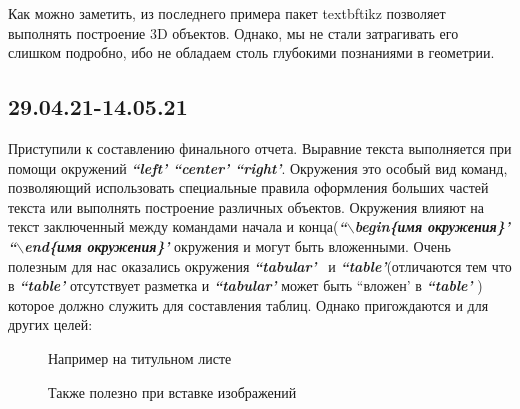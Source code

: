 \documentclass[14pt, a4paper]{extarticle}
\begin{document}
Как можно заметить, из последнего примера пакет textbf{tikz} позволяет выполнять построение 3D объектов. Однако, мы не стали затрагивать его слишком подробно, ибо не обладаем столь глубокими познаниями в геометрии. 

\subsection{29.04.21-14.05.21}
Приступили к составлению финального отчета. Выравние текста выполняется при помощи окружений 
\textit{\textbf{``left' ``center' ``right'}}. Окружения это особый вид команд, позволяющий использовать специальные правила оформления больших частей текста или выполнять построение различных объектов. Окружения влияют на текст заключенный между командами начала и конца(\textit{\textbf{``$\backslash$begin\{имя окружения\}' ``$\backslash$end\{имя окружения\}' }} окружения и могут быть вложенными. Очень полезным для нас оказались окружения \textit{\textbf{``tabular'}} \ и \textit{\textbf{``table'}}(отличаются тем что в \textit{\textbf{``table'}} отсутствует разметка и \textit{\textbf{``tabular'}} может быть ``вложен' в \textit{\textbf{``table'}} ) которое должно служить для составления таблиц. Однако пригождаются и для других целей:

\begin{figure}[h!]
\setlength{\fboxsep}{0pt}%
\setlength{\fboxrule}{2pt}%
%
\caption{Например на титульном листе}
\end{figure}

\newpage

\begin{figure}[h!]
\setlength{\fboxsep}{0pt}%
\setlength{\fboxrule}{2pt}%
%
\caption{Также полезно при вставке изображений}
\end{figure}
\end{document}
